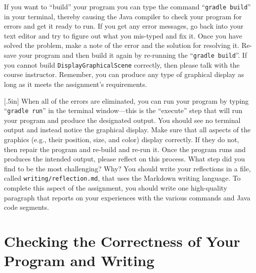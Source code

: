 \documentclass[11pt]{article}
\newcommand{\mainprogram}{\lstinline{DisplayGraphicalScene}}
\newcommand{\reflection}{\lstinline{writing/reflection.md}}
\newcommand{\gradlebuild}{\command{gradle build}}
\newcommand{\gradlerun}{\command{gradle run}}
\newcommand{\command}[1]{``\lstinline{#1}''}
\newcommand{\program}[1]{\lstinline{#1}}
\newcommand{\option}[1]{``{#1}''}
\newcommand{\step}[1]{``{#1}''}
\newcommand{\think}[1]{\null\hfill\LARGE{\faCogs{}}\newline\scriptsize{\em{#1}}}
\begin{document}

If you want to \step{build} your program you can type the command \gradlebuild{}
in your terminal, thereby causing the Java compiler to check your program for
errors and get it ready to run. If you get any error messages, go back into your
text editor and try to figure out what you mis-typed and fix it. Once you have
solved the problem, make a note of the error and the solution for resolving it.
Re-save your program and then build it again by re-running the \gradlebuild{}.
If you cannot build \mainprogram{} correctly, then please talk with the course
instructor. Remember, you can produce any type of graphical display as long as
it meets the assignment's requirements.

\marginnote{\think{Reflect on challenges}}[.5in] When all of the errors are
eliminated, you can run your program by typing \gradlerun{} in the terminal
window---this is the ``execute'' step that will run your program and produce the
designated output. You should see no terminal output and instead notice the
graphical display. Make sure that all aspects of the graphics (e.g., their
position, size, and color) display correctly. If they do not, then repair the
program and re-build and re-run it. Once the
program runs and produces the intended output, please reflect on this process.
What step did you find to be the most challenging? Why? You should write your
reflections in a file, called \reflection{}, that uses the Markdown writing
language. To complete this aspect of the assignment, you should write one
high-quality paragraph that reports on your experiences with the various
commands and Java code segments.

\section*{Checking the Correctness of Your Program and Writing}
\end{document}
